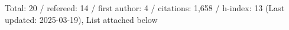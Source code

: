 Total: 20 / refereed: 14 / first author: 4 / citations: 1,658 / h-index: 13 (Last updated: 2025-03-19), List attached below